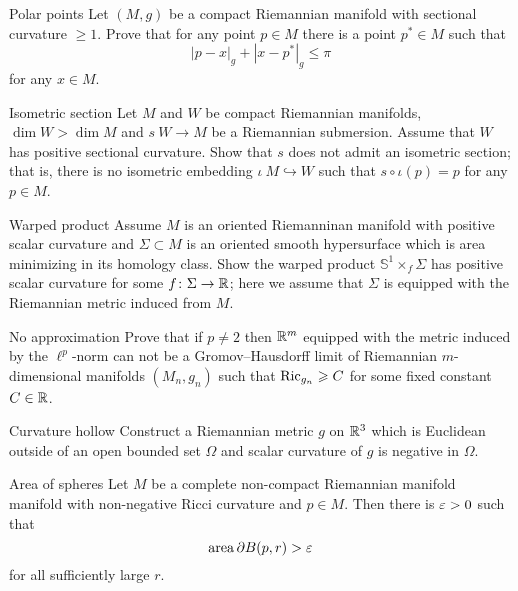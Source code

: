 \documentclass[twoside]{book}
\begin{document}
\begin{pr}{\many}{Polar points} \label{milka-polar} Let $(M,g)$ be a compact Riemannian manifold with sectional curvature $\ge 1$. 
Prove that for any point $p\in M$ there is a point $p^*\in M$ such that 
\[|p-x|_g+|x-p^*|_g\le \pi\]
for any $x\in M$.
\end{pr}

\begin{pr}{\hard}{Isometric section}\label{Isometric section}
Let $M$ and $W$ be compact Riemannian manifolds,
$\dim W>\dim M$
and $s\:W\to M$ be a Riemannian submersion.
Assume that $W$ has positive sectional curvature.
Show that $s$ does not admit an isometric section;
that is, there is no isometric embedding $\iota\:M\hookrightarrow W$ such that $s\circ\iota(p)=p$ for any $p\in M$.
\end{pr}

\begin{pr}{}{Warped product}\label{Warped product}
Assume $M$ is an oriented Riemanninan manifold with positive scalar curvature 
and $\Sigma\subset M$ is an oriented smooth hypersurface which is area minimizing in its homology class.
Show the warped product $\mathbb S^1\times_f \Sigma$
has positive scalar curvature for some $f\colon\Sigma\to \mathbb{R}$;
here we assume that $\Sigma$ is equipped with the Riemannian metric
induced from $M$.
\end{pr}



\begin{pr}{\many}{No approximation}\label{No approximation}
Prove that if $p\not=2$ then $\mathbb{R}^m$ 
equipped with the metric induced by the $\ell^p$-norm 
can not be a
Gromov--Hausdorff limit of
Riemannian $m$-dimensional manifolds $(M_n,g_n)$ such that $\Ric_{g_n}\z\ge C$ for some fixed constant $C\in\mathbb{R}$.
\end{pr}

\begin{pr}{}{Curvature hollow}\label{Curvature hollow}
Construct a Riemannian metric $g$ on $\mathbb{R}^3$ 
which is Euclidean outside of an open bounded set $\Omega$ 
and scalar curvature of $g$ is negative in $\Omega$.
\end{pr}

\begin{pr}{}{Area of spheres}\label{Area of spheres}
Let $M$ be a complete non-compact Riemannian manifold manifold 
with non-negative Ricci curvature and $p\in M$.
Then there is $\varepsilon>0$ such that 
$$\operatorname{\rm area}\partial B(p,r)>\varepsilon$$
for all sufficiently large $r$.
\end{pr}
\end{document}
